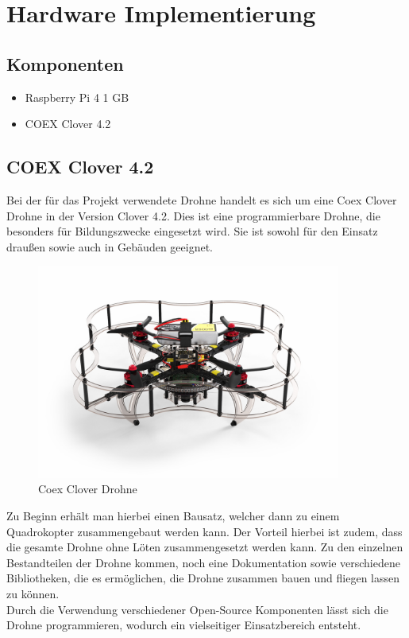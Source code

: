 \chapter{Hardware Implementierung}



\section{Komponenten}

\begin{itemize}
    \item{Raspberry Pi 4 1 GB}
    \item{COEX Clover 4.2}
\end{itemize}

\section{COEX Clover 4.2}
Bei der für das Projekt verwendete Drohne handelt es sich um eine Coex Clover Drohne in der Version Clover 4.2. Dies ist eine programmierbare Drohne, die besonders für Bildungszwecke eingesetzt wird. Sie ist sowohl für den Einsatz draußen sowie auch in Gebäuden geeignet. \\

\begin{figure}[htpb]
    \centering
    \includegraphics[width=10cm,keepaspectratio,angle=0]{images/coex_clover.jpg}
    \caption[Coex Clover Drohne]{\label{img coex_clover} Coex Clover Drohne \cite{imgcoexclover}}
\end{figure}


Zu Beginn erhält man hierbei einen Bausatz, welcher dann zu einem Quadrokopter zusammengebaut werden kann. Der Vorteil hierbei ist zudem, dass die gesamte Drohne ohne Löten zusammengesetzt werden kann. Zu den einzelnen Bestandteilen der Drohne kommen, noch eine Dokumentation sowie verschiedene Bibliotheken, die es ermöglichen, die Drohne zusammen bauen und fliegen lassen zu können. \\
Durch die Verwendung verschiedener Open-Source Komponenten lässt sich die Drohne programmieren, wodurch ein vielseitiger Einsatzbereich entsteht.\\

